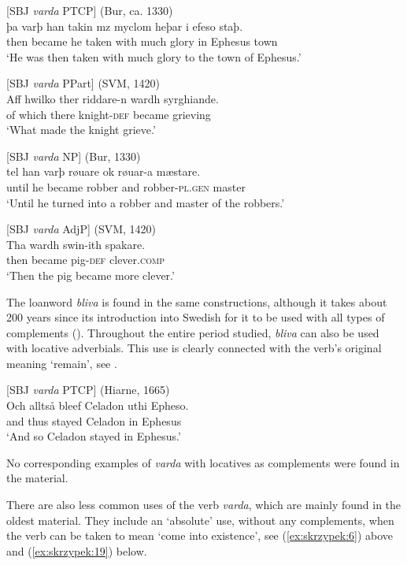 \documentclass[output=paper,colorlinks,citecolor=brown]{langscibook}
\begin{document}
\ea \label{ex:skrzypek:14}
    [SBJ \textit{varda} PTCP] (Bur, ca. 1330)\\
    \gll þa varþ han takin mz myclom heþar i efeso staþ.\\
    then became he taken with much glory in Ephesus town\\
    \glt ‘He was then taken with much glory to the town of Ephesus.’
\z

\ea \label{ex:skrzypek:15}
    [SBJ \textit{varda} PPart] (SVM, 1420)\\
    \gll Aff hwilko ther riddare-n wardh syrghiande.\\
    of which there knight-\textsc{def} became grieving\\
    \glt ‘What made the knight grieve.’
\z

\ea \label{ex:skrzypek:16}
    [SBJ \textit{varda} NP] (Bur, 1330)\\
    \gll tel han varþ røuare ok røuar-a mæstare.\\
    until he became robber and robber-\textsc{pl.gen} master\\
    \glt ‘Until he turned into a robber and master of the robbers.’
\z

\ea \label{ex:skrzypek:17}
    [SBJ \textit{varda} AdjP] (SVM, 1420)\\
    \gll Tha wardh swin-ith spakare.\\
    then became pig-\textsc{def} clever.\textsc{comp}\\
    \glt ‘Then the pig became more clever.’
\z


The loanword \textit{bliva} is found in the same constructions, although it takes about 200 years since its introduction into Swedish for it to be used with all types of complements (\cite{Skrzypek2024}). Throughout the entire period studied, \textit{bliva} can also be used with locative adverbials. This use is clearly connected with the verb’s original meaning ‘remain’, see . 

\ea \label{ex:skrzypek:18}
    [SBJ \textit{varda} PTCP] (Hiarne, 1665)\\
    \gll Och alltså bleef Celadon uthi Epheso.\\
    and thus stayed Celadon in Ephesus\\
    \glt ‘And so Celadon stayed in Ephesus.’
\z

No corresponding examples of \textit{varda} with locatives as complements were found in the material.

There are also less common uses of the verb \textit{varda}, which are mainly found in the oldest material. They include an ‘absolute’ use, without any complements, when the verb can be taken to mean ‘come into existence’, see (\ref{ex:skrzypek:6}) above and (\ref{ex:skrzypek:19}) below. 
\end{document}
